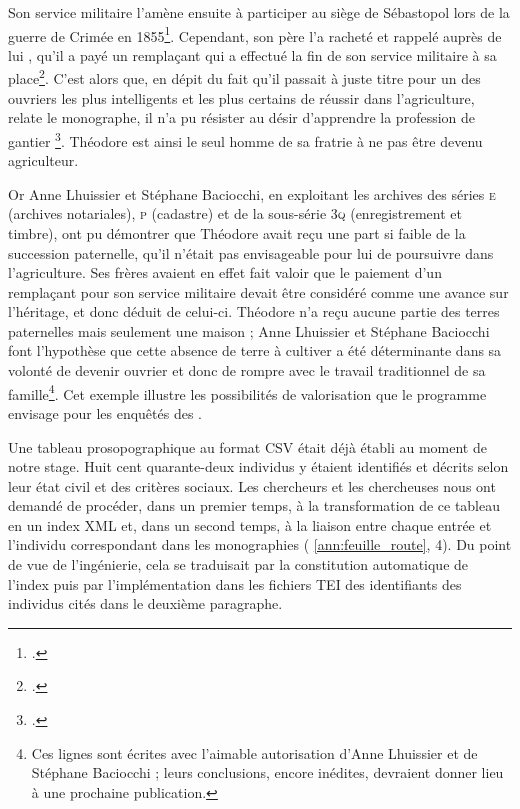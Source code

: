 Son service militaire l'amène ensuite à participer au siège de Sébastopol lors de la guerre de Crimée en 1855\footcite[p. 471]{mono055a}. Cependant, son père \og l'a racheté et rappelé auprès de lui \fg{}, \cad{} qu'il a payé un remplaçant qui a effectué la fin de son service militaire à sa place\footcite[p. 471]{mono055a}. C'est alors que, en dépit du fait qu'il \og passait à juste titre pour un des ouvriers les plus intelligents et les plus certains de réussir \fg{} dans l'agriculture, relate le monographe, \og il n'a pu résister au désir d'apprendre la profession de gantier \fg{}\footcite[p. 471]{mono055a}. Théodore est ainsi le seul homme de sa fratrie à ne pas être devenu agriculteur.

Or Anne Lhuissier et Stéphane Baciocchi, en exploitant les archives des séries \textsc{e} (archives notariales), \textsc{p} (cadastre) et de la sous-série \textsc{3q} (enregistrement et timbre), ont pu démontrer que Théodore avait reçu une part si faible de la succession paternelle, qu'il n'était pas envisageable pour lui de poursuivre dans l'agriculture. Ses frères avaient en effet fait valoir que le paiement d'un remplaçant pour son service militaire devait être considéré comme une avance sur l'héritage, et donc déduit de celui-ci. Théodore n'a reçu aucune partie des terres paternelles mais seulement une maison ; Anne Lhuissier et Stéphane Baciocchi font l'hypothèse que cette absence de terre à cultiver a été déterminante dans sa volonté de devenir ouvrier et donc de rompre avec le travail traditionnel de sa famille\footnote{Ces lignes sont écrites avec l'aimable autorisation d'Anne Lhuissier et de Stéphane Baciocchi ; leurs conclusions, encore inédites, devraient donner lieu à une prochaine publication.}. Cet exemple illustre les possibilités de valorisation que le programme \timeus{} envisage pour les enquêtés des \odm.

Une tableau prosopographique au format CSV était déjà établi au moment de notre stage. Huit cent quarante-deux individus y étaient identifiés et décrits selon leur état civil et des critères sociaux. Les chercheurs et les chercheuses nous ont demandé de procéder, dans un premier temps, à la transformation de ce tableau en un  index XML et, dans un second temps, à la liaison entre chaque entrée et l'individu correspondant dans les monographies (\ann{} \ref{ann:feuille_route}, \issue{} 4). Du point de vue de l'ingénierie, cela se traduisait par la constitution automatique de l'index puis par l'implémentation dans les fichiers TEI des identifiants des individus cités dans le deuxième paragraphe.


